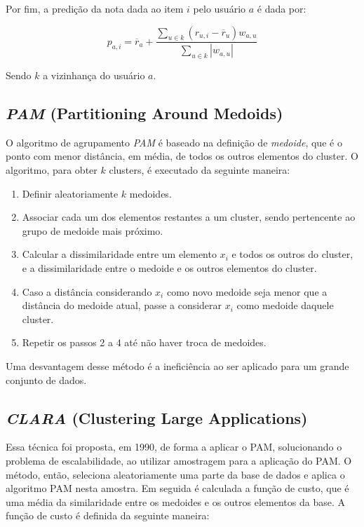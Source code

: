 \documentclass[12pt,a4paper,header]{abnt}
\begin{document}
Por fim, a predição da nota dada ao item $i$ pelo usuário $a$ é dada por:

\begin{equation}
p_{a, i} = \overline{r}_a + \frac{\sum_{u \in k}{(r_{u, i} - \overline{r}_u) w_{a, u}}}{\sum_{u \in k}{\left|w_{a, u}\right|}}
\end{equation}

Sendo $k$ a vizinhança do usuário $a$.

\subsection{\textit{PAM} (Partitioning Around Medoids)}

O algoritmo de agrupamento \textit{PAM} é baseado na definição de \textit{medoide}, que é o ponto com menor distância, em média, de todos os outros elementos do cluster. O algoritmo, para obter $k$ clusters, é executado da seguinte maneira\cite{do2005agrupamentos}:

\begin{enumerate}

\item{Definir aleatoriamente $k$ medoides.}
\item{Associar cada um dos elementos restantes a um cluster, sendo pertencente ao grupo de medoide mais próximo.}
\item{Calcular a dissimilaridade entre um elemento $x_i$ e todos os outros do cluster, e a dissimilaridade entre o medoide e os outros elementos do cluster.}
\item{Caso a distância considerando $x_i$ como novo medoide seja menor que a distância do medoide atual, passe a considerar $x_i$ como medoide daquele cluster.}
\item{Repetir os passos 2 a 4 até não haver troca de medoides.}

\end{enumerate}

Uma desvantagem desse método é a ineficiência ao ser aplicado para um grande conjunto de dados\cite{park2009simple}.

\subsection{\textit{CLARA} (Clustering Large Applications)}

Essa técnica foi proposta, em 1990, de forma a aplicar o PAM, solucionando o problema de escalabilidade, ao utilizar amostragem para a aplicação do PAM\cite{park2009simple}. O método, então, seleciona aleatoriamente uma parte da base de dados e aplica o algoritmo PAM nesta amostra. Em seguida é calculada a função de custo, que é uma média da similaridade entre os medoides e os outros elementos da base\cite{bhat2014k}. A função de custo é definida da seguinte maneira:
\end{document}
